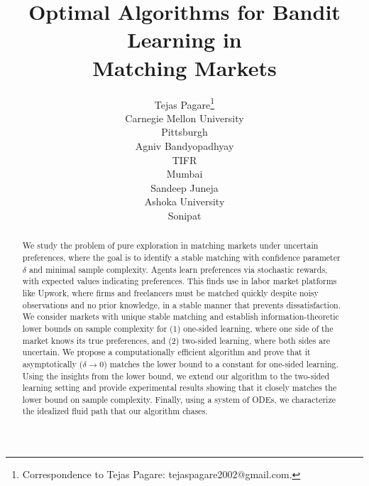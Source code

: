 \documentclass{article}
\title{Optimal Algorithms for Bandit Learning in \\Matching Markets}
\author{%
  Tejas Pagare\thanks{Correspondence to Tejas Pagare: tejaspagare2002@gmail.com.} \\
  Carnegie Mellon University \\
  Pittsburgh \\
  \And
  Agniv Bandyopadhyay \\
  TIFR \\
  Mumbai \\
  \And
  Sandeep Juneja \\
  Ashoka University \\
  Sonipat \\
}
\begin{document}
\maketitle


\begin{abstract}
We study the problem of pure exploration in matching markets under uncertain preferences, where the goal is to identify a stable matching with confidence parameter $\delta$ and minimal sample complexity. Agents learn preferences via stochastic rewards, with expected values indicating preferences. This finds use in labor market platforms like Upwork, where firms and freelancers must be matched quickly despite noisy observations and no prior knowledge, in a stable manner that prevents dissatisfaction. We consider markets with unique stable matching and establish information-theoretic lower bounds on sample complexity for (1) one-sided learning, where one side of the market knows its true preferences, and (2) two-sided learning, where both sides are uncertain. We propose a computationally efficient algorithm and prove that it asymptotically ($\delta\to 0$) matches the lower bound to a constant for one-sided learning. Using the insights from the lower bound, we extend our algorithm to the two-sided learning setting and provide experimental results showing that it closely matches the lower bound on sample complexity. Finally, using a system of ODEs, we characterize the idealized fluid path that our algorithm chases.
\end{abstract}
\end{document}
